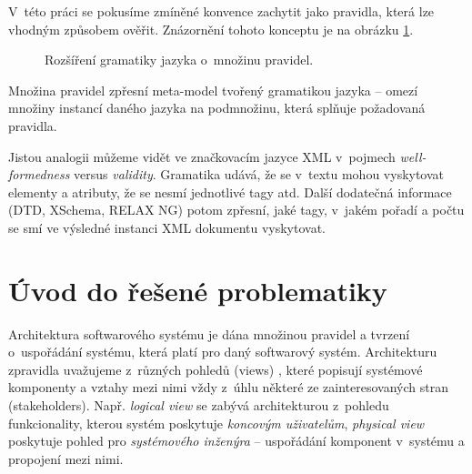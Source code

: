 V~této práci se pokusíme zmíněné konvence zachytit jako pravidla, která lze vhodným způsobem ověřit. Znázornění tohoto konceptu je na obrázku \ref{work_scope}.
\begin{figure}[h!]
  \centering
  \caption{Rozšíření gramatiky jazyka o~množinu pravidel.\label{work_scope}}
\end{figure}
Množina pravidel zpřesní meta-model tvořený gramatikou jazyka -- omezí množiny instancí daného jazyka na podmnožinu, která splňuje požadovaná pravidla.

Jistou analogii můžeme vidět ve značkovacím jazyce XML v~pojmech \emph{well-formedness} versus \emph{validity}. Gramatika udává, že se v~textu mohou vyskytovat elementy a atributy, že se nesmí  jednotlivé tagy atd. Další dodatečná informace (DTD, XSchema, RELAX NG) potom zpřesní, jaké tagy, v~jakém pořadí a počtu se smí ve výsledné instanci XML dokumentu vyskytovat.

\section{Úvod do řešené problematiky}

Architektura softwarového systému \cite{wiki:software_architecture} je dána množinou pravidel a tvrzení o~uspořádání systému, která platí pro daný softwarový systém. Architekturu zpravidla uvažujeme z~různých pohledů (views) \cite{wiki:four_plus_one_views}, které popisují systémové komponenty a vztahy mezi nimi vždy z~úhlu některé ze zainteresovaných stran (stakeholders). Např. \emph{logical view} se zabývá architekturou z~pohledu funkcionality, kterou systém poskytuje \emph{koncovým uživatelům}, \emph{physical view} poskytuje pohled pro \emph{systémového inženýra} -- uspořádání komponent v~systému a propojení mezi nimi.

